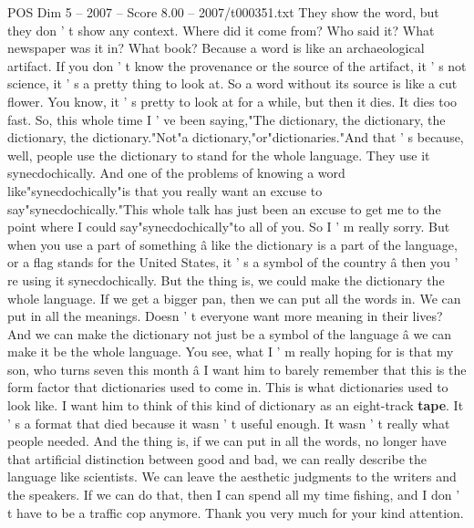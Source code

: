 \begin{textsample}{POS Dim 5 – 2007 – Score 8.00 – 2007/t000351.txt}
They show the word, but they don ' t show any context.
Where did it come from?
Who said it?
What newspaper was it in?
What book?
Because a word is like an archaeological artifact.
If you don ' t know the provenance or the source of the artifact, it ' s not science, it ' s a pretty thing to look at.
So a word without its source is like a cut flower.
You know, it ' s pretty to look at for a while, but then it dies.
It dies too fast.
So, this whole time I ' ve been saying,"The dictionary, the dictionary, the dictionary, the dictionary."Not"a dictionary,"or"dictionaries."And that ' s because, well, people use the dictionary to stand for the whole language.
They use it synecdochically.
And one of the problems of knowing a word like"synecdochically"is that you really want an excuse to say"synecdochically."This whole talk has just been an excuse to get me to the point where I could say"synecdochically"to all of you.
So I ' m really sorry.
But when you use a part of something â like the dictionary is a part of the language, or a flag stands for the United States, it ' s a symbol of the country â then you ' re using it synecdochically.
But the thing is, we could make the dictionary the whole language.
If we get a bigger pan, then we can put all the words in.
We can put in all the meanings.
Doesn ' t everyone want more meaning in their lives?
And we can make the dictionary not just be a symbol of the language â we can make it be the whole language.
You see, what I ' m really hoping for is that my son, who turns seven this month â I want him to barely remember that this is the form factor that dictionaries used to come in.
This is what dictionaries used to look like.
I want him to think of this kind of dictionary as an eight-track \textbf{tape}.
It ' s a format that died because it wasn ' t useful enough.
It wasn ' t really what people needed.
And the thing is, if we can put in all the words, no longer have that artificial distinction between good and bad, we can really describe the language like scientists.
We can leave the aesthetic judgments to the writers and the speakers.
If we can do that, then I can spend all my time fishing, and I don ' t have to be a traffic cop anymore.
Thank you very much for your kind attention.

\end{textsample}

